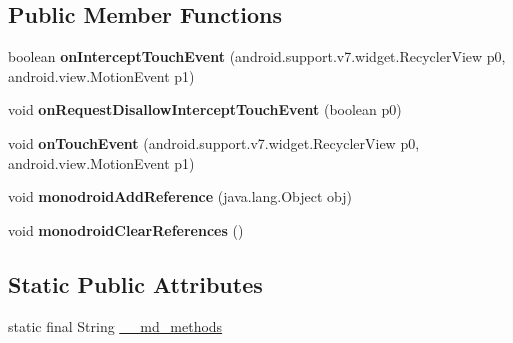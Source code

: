 \subsection*{Public Member Functions}
\begin{DoxyCompactItemize}
\item 
\mbox{\label{classmono_1_1android_1_1support_1_1v7_1_1widget_1_1_recycler_view___on_item_touch_listener_implementor_a8a0736f0a9d7a6f76bda7054dcb41dba}} 
boolean {\bfseries on\+Intercept\+Touch\+Event} (android.\+support.\+v7.\+widget.\+Recycler\+View p0, android.\+view.\+Motion\+Event p1)
\item 
\mbox{\label{classmono_1_1android_1_1support_1_1v7_1_1widget_1_1_recycler_view___on_item_touch_listener_implementor_a4f354b716f02d9a0503d7758eee6bacc}} 
void {\bfseries on\+Request\+Disallow\+Intercept\+Touch\+Event} (boolean p0)
\item 
\mbox{\label{classmono_1_1android_1_1support_1_1v7_1_1widget_1_1_recycler_view___on_item_touch_listener_implementor_a5cad879ac69bfe24f07d5206df2d735c}} 
void {\bfseries on\+Touch\+Event} (android.\+support.\+v7.\+widget.\+Recycler\+View p0, android.\+view.\+Motion\+Event p1)
\item 
\mbox{\label{classmono_1_1android_1_1support_1_1v7_1_1widget_1_1_recycler_view___on_item_touch_listener_implementor_acf33c28d463b81a7c5869ff7e88194de}} 
void {\bfseries monodroid\+Add\+Reference} (java.\+lang.\+Object obj)
\item 
\mbox{\label{classmono_1_1android_1_1support_1_1v7_1_1widget_1_1_recycler_view___on_item_touch_listener_implementor_ac6775e7a24e7759275a4bcc438d89cce}} 
void {\bfseries monodroid\+Clear\+References} ()
\end{DoxyCompactItemize}
\subsection*{Static Public Attributes}
\begin{DoxyCompactItemize}
\item 
static final String \hyperlink{classmono_1_1android_1_1support_1_1v7_1_1widget_1_1_recycler_view___on_item_touch_listener_implementor_af3805010ccf5976fd0ef488ea4cc6ae7}{\+\_\+\+\_\+md\+\_\+methods}
\end{DoxyCompactItemize}


